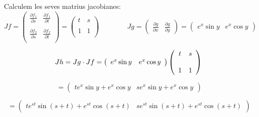 \documentclass[12pt]{article}
\begin{document}
Calculem les seves matrius jacobianes:
\begin{equation*}
Jf=\left(\begin{array} {cc}
   \displaystyle\frac{\partial f_1}{\partial s} & \displaystyle\frac{\partial f_1}{\partial t} \\
   &\\
   \displaystyle\frac{\partial f_2}{\partial s} & \displaystyle\frac{\partial f_2}{\partial t} \\
   \end{array} \right)=
   \left(\begin{array} {cc}
   t &  s \\
  &\\
  1 & 1 \\
   \end{array} \right)
   \qquad\qquad Jg=\left(\begin{array} {cc}
  \displaystyle \frac{\partial g}{\partial x} & \displaystyle\frac{\partial g}{\partial y}
\end{array} \right)=\left(\begin{array} {cc}
 e^x \sin y  & e^x \cos y
\end{array} \right)
\end{equation*}

\begin{equation*}
Jh=Jg\cdot Jf = \left(\begin{array} {cc}
 e^x \sin y  & e^x \cos y
\end{array} \right)\left(\begin{array} {cc}
   t & s \\
  &\\
  1 & 1 \\
   \end{array} \right)\\
\end{equation*}

\begin{equation*}
   =\left(\begin{array} {cc}
 t e^x \sin y + e^x
\cos y  & se^x \sin y +  e^x\cos y
\end{array} \right)
\end{equation*}

\begin{equation*}
   =\left(\begin{array} {cc}
 t e^{s t}\sin (s+ t) +  e^{s t} \cos (s+ t)  &
  s e^{s t}\sin (s+t) +  e^{s t} \cos (s+t)
\end{array} \right)
\end{equation*}
\end{document}
